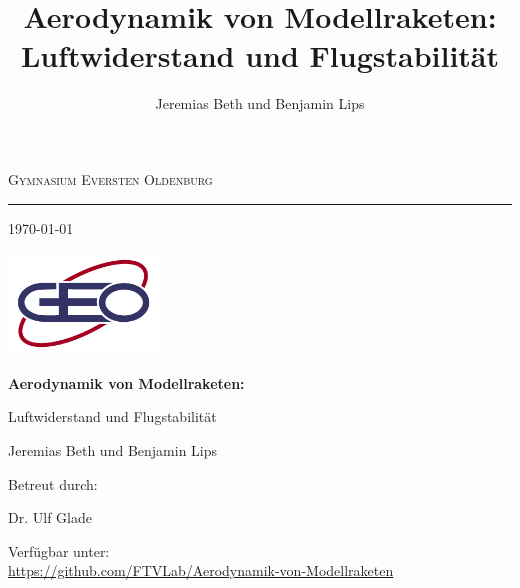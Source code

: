 \documentclass[10pt,a4paper]{article}
\author{Jeremias Beth und Benjamin Lips}
\title{Aerodynamik von Modellraketen: Luftwiderstand und  Flugstabilität}
\begin{document}
\begin{titlepage}
	\centering
	{\scshape\huge Gymnasium Eversten Oldenburg} 
	\noindent\rule{\textwidth}{0.5pt} %
	{\large \today} %
	\vspace{0.5cm}
	
	\includegraphics[width=4cm]{Bilder/GEO-logo.png} %
	
	\vspace{2cm}
	{\LARGE \bfseries Aerodynamik von Modellraketen: %
	
	\smallskip Luftwiderstand und Flugstabilität}
	
	\vspace{1cm}
	{\large Jeremias Beth und Benjamin Lips} %
	
	\vspace{2cm}
	{\large Betreut durch: %
		
		\smallskip Dr. Ulf Glade}
	
	\vspace{3cm}
	{Verfügbar unter: \\ \url{https://github.com/FTVLab/Aerodynamik-von-Modellraketen}}
\end{titlepage}


\setcounter{page}{2}
\end{document}
